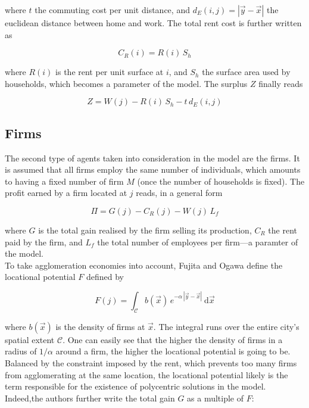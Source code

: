 where $t$ the commuting cost per unit distance, and $d_E(i,j) = \left| \vec{y} -
\vec{x} \right|$ the euclidean distance between home and work. The total rent
cost is further written as

\begin{equation}
    C_R\left(i\right) = R(i)\,S_h
\end{equation}

where $R(i)$ is the rent per unit surface at $i$, and $S_h$ the surface area
used by households, which becomes a parameter of the model.
The surplus $Z$
finally reads

\begin{equation}
    Z = W\left(j\right)
      - R\left(i\right)\,S_h
      - t\,d_E\left(i,j\right)
\end{equation} 


\subsection{Firms}
\label{sub:firms}

The second type of agents taken into consideration in the model are the firms.
It is assumed that all firms employ the same number of individuals, which
amounts to having a fixed number of firm $M$ (once the number of households is
fixed). The profit earned by a firm  located at $j$ reads, in a general
form

\begin{equation}
    \Pi = G\left(j\right) 
        - C_R\left(j\right) 
        -  W\left(j\right)\,L_f
\end{equation}

where $G$ is the total gain realised by the firm selling its production, $C_R$
the rent paid by the firm, and $L_f$ the total number of employees per firm---a
paramter of the model.\\

To take agglomeration economies into account, Fujita and Ogawa define the
locational potential $F$ defined by

\begin{equation}
    F\left(j\right) = \int_{\mathcal{C}} b(\vec{x})\,e^{-\alpha\,\left|\vec{y}-\vec{x}\right|}\:\mathrm{d}\vec{x}
\end{equation}

where $b(\vec{x})$ is the density of firms at $\vec{x}$. The integral runs over
the entire city's spatial extent $\mathcal{C}$. One can easily see that the
higher the density of firms in a radius of $1/\alpha$ around a firm, the higher
the locational potential is going to be. Balanced by the constraint imposed by
the rent, which prevents too many firms from agglomerating at the same location,
the locational potential likely is the term responsible for the existence of
polycentric solutions in the model. Indeed,the authors further write the total
gain $G$ as a multiple of $F$:

